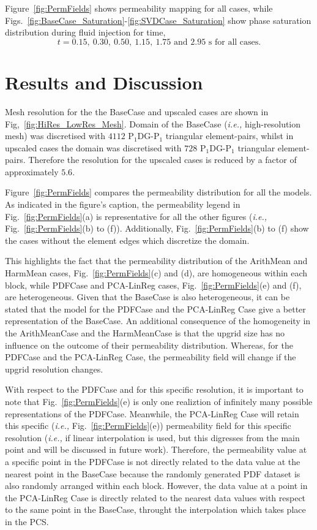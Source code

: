 \documentclass[preprint,12pt]{elsarticle}
\newcommand{\PN}[2][error]{P$_{#1}$DG-P$_{#2}$}
\newcommand{\ie}{{\it i.e., }}
\begin{document}
Figure~\ref{fig:PermFields} shows permeability mapping for all cases, while Figs.~\ref{fig:BaseCase_Saturation}-\ref{fig:SVDCase_Saturation} show phase saturation distribution during fluid injection for time,
\begin{displaymath}
  t = 0.15,~0.30,~0.50,~1.15,~1.75\text{ and } 2.95 \text{ s for all cases.} 
\end{displaymath}

\section{Results and Discussion}\label{section:results_discussion}

Mesh resolution for the the BaseCase and upscaled cases are shown in Fig,~\ref{fig:HiRes_LowRes_Mesh}. Domain of the BaseCase (\ie high-resolution mesh) was discretised with $4112$ \PN[1]{1} triangular element-pairs, whilst in upscaled cases the domain was discretised with $728$ \PN[1]{1} triangular element-pairs. Therefore the resolution for the upscaled cases is reduced by a factor of approximately $5.6$.

Figure~\ref{fig:PermFields} compares the permeability distribution for all the models. As indicated in the figure's caption, the permeability legend in Fig.~\ref{fig:PermFields}(a) is representative for all the other figures (\ie Fig.~\ref{fig:PermFields}(b) to (f)). Additionally, Fig.~\ref{fig:PermFields}(b) to (f) show the cases without the element edges which discretize the domain.

This highlights the fact that the permeability distribution of the ArithMean and HarmMean cases, Fig.~\ref{fig:PermFields}(c) and (d), are homogeneous within each block, while PDFCase and PCA-LinReg cases, Fig.~\ref{fig:PermFields}(e) and (f), are heterogeneous. Given that the BaseCase is also heterogeneous, it can be stated that the model for the PDFCase and the PCA-LinReg Case give a better representation of the BaseCase. An additional consequence of the homogeneity in the ArithMeanCase and the HarmMeanCase is that the upgrid size has no influence on the outcome of their permeability distribution. Whereas, for the PDFCase and the PCA-LinReg Case, the permeability field will change if the upgrid resolution changes.

With respect to the PDFCase and for this specific resolution, it is important to note that Fig.~\ref{fig:PermFields}(e) is only one realiztion of infinitely many possible representations of the PDFCase. Meanwhile, the PCA-LinReg Case will retain this specific (\ie Fig.~\ref{fig:PermFields}(e)) permeability field for this specific resolution (\ie if linear interpolation is used, but this digresses from the main point and will be discussed in future work). Therefore, the permeability value at a specific point in the PDFCase is not directly related to the data value at the nearest point in the BaseCase because the randomly generated PDF dataset is also randomly arranged within each block. However, the data value at a point in the PCA-LinReg Case is directly related to the nearest data values with respect to the same point in the BaseCase, throught the interpolation which takes place in the PCS.
\end{document}
